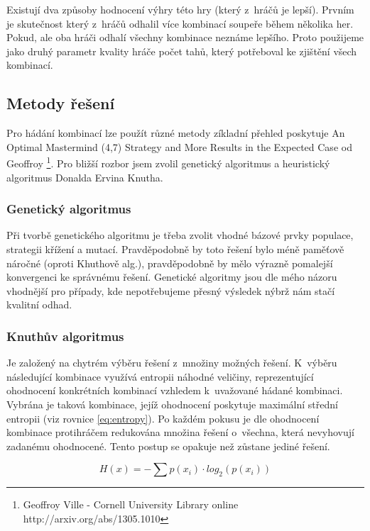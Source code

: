 \documentclass[12pt, a4paper]{article}
\begin{document}
Existují dva způsoby hodnocení výhry této hry (který z~hráčů je lepší). Prvním je skutečnost který z~hráčů odhalil více kombinací soupeře během několika her. Pokud, ale oba hráči odhalí všechny kombinace neznáme lepšího. Proto použijeme jako druhý parametr kvality hráče počet tahů, který potřeboval ke zjištění všech kombinací.

\subsection{Metody řešení}

Pro hádání kombinací lze použít různé metody zíkladní přehled poskytuje An Optimal Mastermind (4,7) Strategy and More Results in the Expected Case od Geoffroy \footnote{Geoffroy Ville - Cornell University Library online http://arxiv.org/abs/1305.1010}. Pro bližší rozbor jsem zvolil genetický algoritmus a heuristický algoritmus Donalda Ervina Knutha.

\subsubsection{Genetický algoritmus}

Při tvorbě genetického algoritmu je třeba zvolit vhodné bázové prvky populace, strategii křížení a mutací. Pravděpodobně by toto řešení bylo méně paměťově náročné (oproti Khuthově alg.), pravděpodobně by mělo výrazně pomalejší konvergenci ke správnému řešení. Genetické algoritmy jsou dle mého názoru vhodnější pro případy, kde nepotřebujeme přesný výsledek nýbrž nám stačí kvalitní odhad. 

\subsubsection{Knuthův algoritmus}

Je založený na chytrém výběru řešení z~množiny možných řešení. K~výběru následující kombinace využívá entropii náhodné veličiny, reprezentující ohodnocení konkrétních kombinací vzhledem k~uvažované hádané kombinaci. Vybrána je taková kombinace, jejíž ohodnocení poskytuje maximální střední entropii (viz rovnice \ref{eq:entropy}). Po každém pokusu je dle ohodnocení kombinace protihráčem redukována množina řešení o~všechna, která nevyhovují zadanému ohodnocené. Tento postup se opakuje než zůstane jediné řešení.

\begin{equation}
H(x) = - \sum p(x_i) \cdot log_2(p(x_i))
\label{eq:entropy}
\end{equation}
\end{document}
